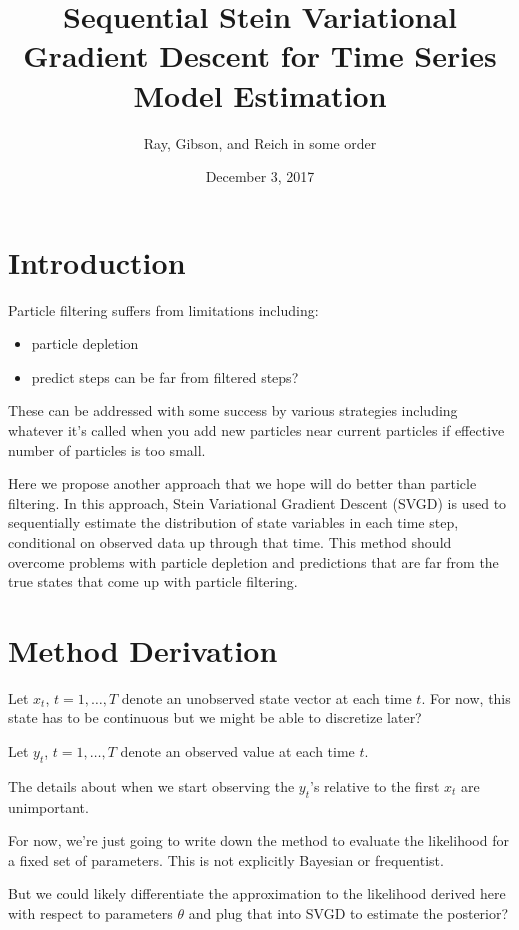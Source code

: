 \documentclass[]{article}
\title{Sequential Stein Variational Gradient Descent for Time Series Model
Estimation}
\author{Ray, Gibson, and Reich in some order}
\date{December 3, 2017}
\begin{document}
\maketitle

\section{Introduction}\label{introduction}

Particle filtering suffers from limitations including:

\begin{itemize}
\item particle depletion
\item predict steps can be far from filtered steps?
\end{itemize}

These can be addressed with some success by various strategies including
whatever it's called when you add new particles near current particles
if effective number of particles is too small.

Here we propose another approach that we hope will do better than
particle filtering. In this approach, Stein Variational Gradient Descent
(SVGD) is used to sequentially estimate the distribution of state
variables in each time step, conditional on observed data up through
that time. This method should overcome problems with particle depletion
and predictions that are far from the true states that come up with
particle filtering.

\section{Method Derivation}\label{method-derivation}

Let \(x_t\), \(t = 1, \ldots, T\) denote an unobserved state vector at
each time \(t\). For now, this state has to be continuous but we might
be able to discretize later?

Let \(y_t\), \(t = 1, \ldots, T\) denote an observed value at each time
\(t\).

The details about when we start observing the \(y_t\)'s relative to the
first \(x_t\) are unimportant.

For now, we're just going to write down the method to evaluate the
likelihood for a fixed set of parameters. This is not explicitly
Bayesian or frequentist.

But we could likely differentiate the approximation to the likelihood
derived here with respect to parameters \(\theta\) and plug that into
SVGD to estimate the posterior?
\end{document}
